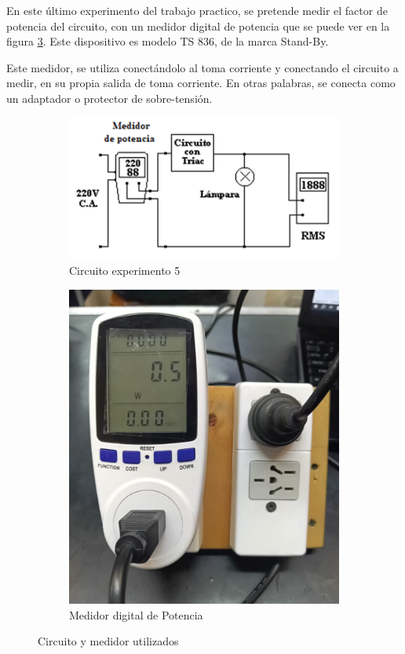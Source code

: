 
En este último experimento del trabajo practico, se pretende medir el factor de potencia del circuito, con un medidor digital de potencia que se puede ver en la figura \ref{fig:mediPot}. Este dispositivo es modelo TS 836, de la marca Stand-By. 

Este medidor, se utiliza conectándolo al toma corriente y conectando el circuito a medir, en su propia salida de toma corriente. En otras palabras, se conecta como un adaptador o protector de sobre-tensión.

\begin{figure}[H]
    \begin{subfigure}{0.6\textwidth}
        \centering
        \includegraphics[width=1\textwidth]{Imagenes/exp5med.png}
     \caption{Circuito experimento 5}
     \label{fig:exp5med}
    \end{subfigure}
    \hspace*{\fill}
    \begin{subfigure}{0.39\textwidth}
        \centering
        \includegraphics[width=0.7\linewidth]{Imagenes/mediPot.jpeg}
        \caption{Medidor digital de Potencia}
        \label{fig:mediPot}
    \end{subfigure}
    \caption{Circuito y medidor utilizados}
\end{figure}

